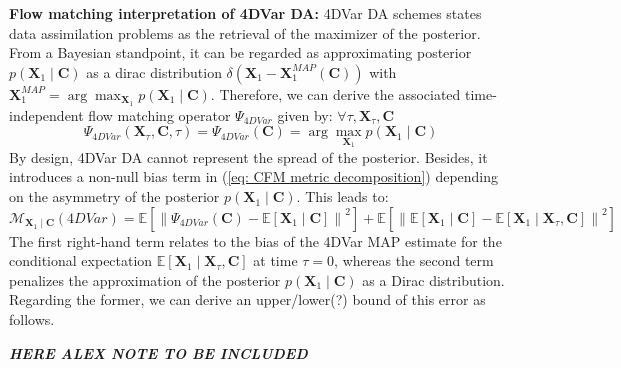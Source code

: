 \documentclass[10pt]{article}
\begin{document}
{\bf Flow matching interpretation of 4DVar DA:} 4DVar DA schemes \cite{carrassi_data_2018} states data assimilation problems as the retrieval of the maximizer of the posterior. From a Bayesian standpoint, it can be regarded as approximating posterior $p(\mathbf{X}_1 \mid \mathbf{C})$ as a dirac distribution $\delta \left( \mathbf{X}_1 -\mathbf{X}_1^{MAP}(\mathbf{C}) \right ) $ with $\mathbf{X}_1^{MAP}=\arg\max_{\mathbf{X}_1} p(\mathbf{X}_1 \mid \mathbf{C})$. Therefore, we can derive the associated time-independent flow matching operator $\Psi_{4DVar}$ given by: $\forall \tau, \mathbf{X}_\tau, \mathbf{C}$
\begin{equation}
    \label{eq: 4dvar cfm}
    \Psi_{4DVar}\left (\mathbf{X}_\tau, \mathbf{C},\tau \right ) = \Psi_{4DVar}\left ( \mathbf{C} \right ) 
    = \displaystyle \arg \max_{\mathbf{X}_1} p(\mathbf{X}_1 \mid \mathbf{C}) 
\end{equation}
By design, 4DVar DA cannot represent the spread of the posterior.  Besides, it introduces a non-null bias term in (\ref{eq: CFM metric decomposition}) depending on the asymmetry of the posterior $p(\mathbf{X}_1 \mid \mathbf{C})$. This leads to:
\begin{equation}
    \label{eq: CFM metric 4DVar}
    \mathcal{M}_{\mathbf{X}_1\mid \mathbf{C}}\left( 4DVar \right)
    = \mathbb{E} \left [  \left \| \Psi_{4DVar}\left ( \mathbf{C}\right ) - \mathbb{E}\left [\mathbf{X}_1 \mid \mathbf{C}\right ] \right \|^2 \right ]+
    \mathbb{E} \left [  \left \| {\mathbb{E}\left [\mathbf{X}_1 \mid \mathbf{C} \right ] - \mathbb{E}\left [\mathbf{X}_1 \mid \mathbf{X}_\tau,\mathbf{C}\right ] }\right \|^2 \right ]
\end{equation}
The first right-hand term relates to the bias of the 4DVar MAP estimate for the conditional expectation $\mathbb{E}\left [\mathbf{X}_1 \mid \mathbf{X}_\tau,\mathbf{C}\right ]$ at time $\tau=0$, whereas the second term penalizes the approximation of the posterior $p(\mathbf{X}_1 \mid \mathbf{C})$ as a Dirac distribution. Regarding the former, we can derive an upper/lower(?) bound of this error as follows. 

{\bf \it HERE ALEX NOTE TO BE INCLUDED}
\end{document}
